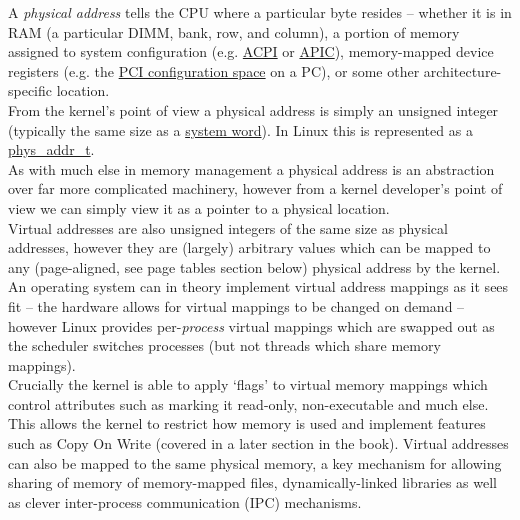 A \emph{physical address}  tells the CPU where a
particular byte resides -- whether it is in RAM (a particular DIMM, bank, row,
and column), a portion of memory assigned to system configuration
(e.g. \href{https://en.wikipedia.org/wiki/Advanced_Configuration_and_Power_Interface}{ACPI}
or
\href{https://en.wikipedia.org/wiki/Advanced_Programmable_Interrupt_Controller}{APIC}),
memory-mapped device registers (e.g. the
\href{https://en.wikipedia.org/wiki/PCI_configuration_space}{PCI configuration
  space} on a PC), or some other architecture-specific location.\\

From the kernel's point of view a physical address is simply an unsigned integer
(typically the same size as a
\href{https://en.wikipedia.org/wiki/Word_(computer_architecture)}{system
  word}). In Linux this is represented as a
\href{https://git.kernel.org/pub/scm/linux/kernel/git/torvalds/linux.git/tree/include/linux/types.h?h=v5.17-rc7#n153}{phys\_addr\_t}.\\

As with much else in memory management a physical address is an abstraction over
far more complicated machinery, however from a kernel developer's point of view
we can simply view it as a pointer to a physical location.\\

Virtual addresses  are also unsigned integers of the same
size as physical addresses, however they are (largely) arbitrary values which
can be mapped to any (page-aligned, see page tables section below) physical
address by the kernel.\\

An operating system can in theory implement virtual address mappings as it sees
fit -- the hardware allows for virtual mappings to be changed on demand -- however
Linux provides per-\emph{process} virtual mappings which are swapped out as the
scheduler switches processes (but not threads which share memory mappings).\\

Crucially the kernel is able to apply `flags' to virtual memory mappings which
control attributes such as marking it read-only, non-executable and much
else. This allows the kernel to restrict how memory is used and implement
features such as Copy On Write (covered in a later section in the book). Virtual
addresses can also be mapped to the same physical memory, a key mechanism for
allowing sharing of memory of memory-mapped files, dynamically-linked libraries
as well as clever inter-process communication (IPC) mechanisms.\\

